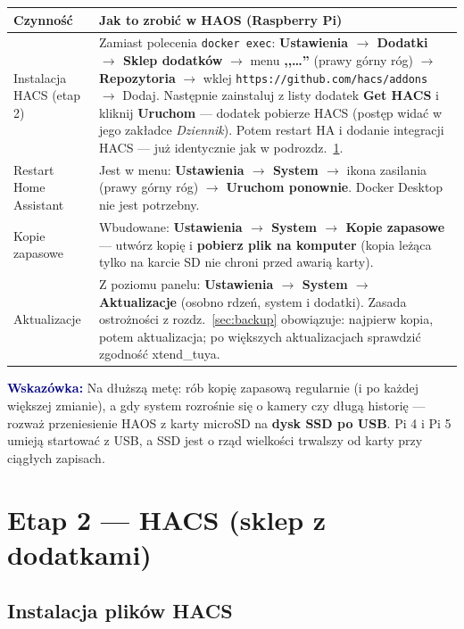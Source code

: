 \documentclass[11pt,a4paper]{article}
\newcommand{\wskazowka}[1]{\par\medskip\noindent\textcolor{navy}{\textbf{Wskazówka:}} #1\par\medskip}
\begin{document}
\begin{center}
\begin{tabular}{>{\raggedright\arraybackslash}p{4.6cm} >{\raggedright\arraybackslash}p{9.6cm}}
\toprule
\textbf{Czynność} & \textbf{Jak to zrobić w HAOS (Raspberry Pi)}\\
\midrule
Instalacja HACS (etap 2) & Zamiast polecenia \texttt{docker exec}: \textbf{Ustawienia $\to$ Dodatki $\to$ Sklep dodatków} $\to$ menu \textbf{,,\ldots''} (prawy górny róg) $\to$ \textbf{Repozytoria} $\to$ wklej \texttt{https://github.com/hacs/addons} $\to$ Dodaj. Następnie zainstaluj z listy dodatek \textbf{Get HACS} i kliknij \textbf{Uruchom} --- dodatek pobierze HACS (postęp widać w jego zakładce \emph{Dziennik}). Potem restart HA i dodanie integracji HACS --- już identycznie jak w podrozdz.~\ref{sec:etap2}.\\
\addlinespace
Restart Home Assistant & Jest w menu: \textbf{Ustawienia $\to$ System $\to$} ikona zasilania (prawy górny róg) $\to$ \textbf{Uruchom ponownie}. Docker Desktop nie jest potrzebny.\\
\addlinespace
Kopie zapasowe & Wbudowane: \textbf{Ustawienia $\to$ System $\to$ Kopie zapasowe} --- utwórz kopię i \textbf{pobierz plik na komputer} (kopia leżąca tylko na karcie SD nie chroni przed awarią karty).\\
\addlinespace
Aktualizacje & Z poziomu panelu: \textbf{Ustawienia $\to$ System $\to$ Aktualizacje} (osobno rdzeń, system i dodatki). Zasada ostrożności z rozdz.~\ref{sec:backup} obowiązuje: najpierw kopia, potem aktualizacja; po większych aktualizacjach sprawdzić zgodność xtend\_tuya.\\
\bottomrule
\end{tabular}
\end{center}

\wskazowka{Na dłuższą metę: rób kopię zapasową regularnie (i po każdej większej zmianie), a gdy system rozrośnie się o kamery czy długą historię --- rozważ przeniesienie HAOS z karty microSD na \textbf{dysk SSD po USB}. Pi 4 i Pi 5 umieją startować z USB, a SSD jest o rząd wielkości trwalszy od karty przy ciągłych zapisach.}

\section{Etap 2 --- HACS (sklep z dodatkami)}
\label{sec:etap2}

\subsection{Instalacja plików HACS}
\end{document}
